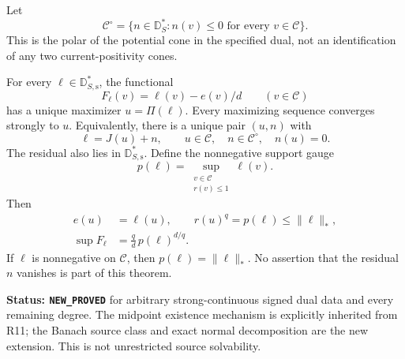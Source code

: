 Let
\[
 \mathscr C^\circ
   =\{n\in\mathbb D_S^*:n(v)\leq0\text{ for every }v\in\mathscr C\}.
 \tag{NI5}
\]
This is the polar of the potential cone in the specified dual,
not an identification of any two current-positivity cones.

\begin{theorem}
\label{thm:r12-nonlinear-normal-decomposition}
For every $\ell\in\mathbb D_{S,\mathrm{s}}^*$, the functional
\[
                F_\ell(v)=\ell(v)-e(v)/d\qquad(v\in\mathscr C)
 \tag{NI6}
\]
has a unique maximizer $u=\Pi(\ell)$. Every maximizing sequence
converges strongly to $u$. Equivalently, there is a unique pair
$(u,n)$ with
\[
       \ell=J(u)+n,\qquad
       u\in\mathscr C,\quad n\in\mathscr C^\circ,
                           \quad n(u)=0.
 \tag{NI7}
\]
The residual also lies in $\mathbb D_{S,\mathrm{s}}^*$.
Define the nonnegative support gauge
\[
       p(\ell)=\sup_{\substack{v\in\mathscr C\\r(v)\leq1}}\ell(v).
 \tag{NI8}
\]
Then
\[
 \begin{split}
 e(u)&=\ell(u),\qquad r(u)^q=p(\ell)\leq\|\ell\|_*,\\
 \sup F_\ell&=\frac qd\,p(\ell)^{d/q}.
 \end{split}
 \tag{NI9}
\]
If $\ell$ is nonnegative on $\mathscr C$, then
$p(\ell)=\|\ell\|_*$. No assertion that the residual $n$ vanishes
is part of this theorem.
\end{theorem}

\noindent\textbf{Status: \texttt{NEW\_PROVED}} for arbitrary
strong-continuous signed dual data and every remaining degree.
The midpoint existence mechanism is explicitly inherited from
R11; the Banach source class and exact normal decomposition
are the new extension. This is not unrestricted source solvability.

